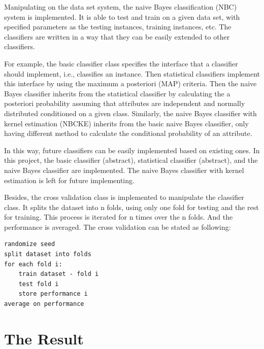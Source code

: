 \documentclass[a4paper,12pt]{article}
\begin{document}
Manipulating on the data set system, the naive Bayes classification (NBC) system is implemented. It is able to test and train on a given data set, with specified parameters as the testing instances, training instances, etc. The classifiers are written in a way that they can be easily extended to other classifiers. 

For example, the basic classifier class specifies the interface that a classifier should implement, i.e., classifies an instance. Then statistical classifiers implement this interface by using the maximum a posteriori (MAP) criteria. Then the naive Bayes classifier inherits from the statistical classifier by calculating the a posteriori probability assuming that attributes are independent and normally distributed conditioned on a given class. Similarly, the naive Bayes classifier with kernel estimation (NBCKE) inherits from the basic naive Bayes classifier, only having different method to calculate the conditional probability of an attribute. 

In this way, future classifiers can be easily implemented based on existing ones. In this project, the basic classifier (abstract), statistical classifier (abstract), and the naive Bayes classifier are implemented. The naive Bayes classifier with kernel estimation is left for future implementing.

Besides, the cross validation class is implemented to manipulate the classifier class. It splits the dataset into n folds, using only one fold for testing and the rest for training. This process is iterated for n times over the n folds. And the performance is averaged. The cross validation can be stated as following:

\begin{verbatim}
randomize seed 
split dataset into folds
for each fold i:
    train dataset - fold i 
    test fold i
    store performance i 
average on performance
\end{verbatim}

\section{The Result}
\label{sec:result}



\end{document}
